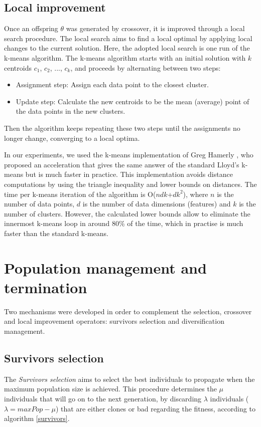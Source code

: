 \subsection{Local improvement}
Once an offspring $\theta$ was generated by crossover, it is improved through a local search procedure. The local search aims to find a local optimal by applying local changes to the current solution. Here, the adopted local search is one run of the k-means algorithm. The k-means algorithm starts with an initial solution with $k$ centroids $c_1$, $c_2$, ..., $c_k$, and proceeds by alternating between two steps:

\begin{itemize}

	\item Assignment step: Assign each data point to the closest cluster.

	\item Update step: Calculate the new centroids to be the mean (average) point of the data points in the new clusters.
	
\end{itemize}

Then the algorithm keeps repeating these two steps until the assignments no longer change, converging to a local optima.

In our experiments, we used the k-means implementation of Greg Hamerly \cite{Hamerly2010}, who proposed an acceleration that gives the same answer of the standard Lloyd's k-means but is much faster in practice. This implementation avoids distance computations by using the triangle inequality and lower bounds on distances. The time per k-means iteration of the algorithm is O($ndk$+$dk^2$), where $n$ is the number of data points, $d$ is the number of data dimensions (features) and $k$ is the number of clusters. However, the calculated lower bounds allow to eliminate the innermost k-means loop in around 80\% of the time, which in practise is much faster than the standard k-means.

\section{Population management and termination}
Two mechanisms were developed in order to complement the selection, crossover and local improvement operators: survivors selection and diversification management.

\subsection{Survivors selection}
The \textit{Survivors selection} aims to select the best individuals to propagate when the maximum population size is achieved. This procedure determines the $\mu$ individuals that will go on to the next generation, by discarding $\lambda$ individuals ($\lambda = maxPop - \mu$) that are either clones or bad regarding the fitness, according to algorithm \ref{survivors}.

